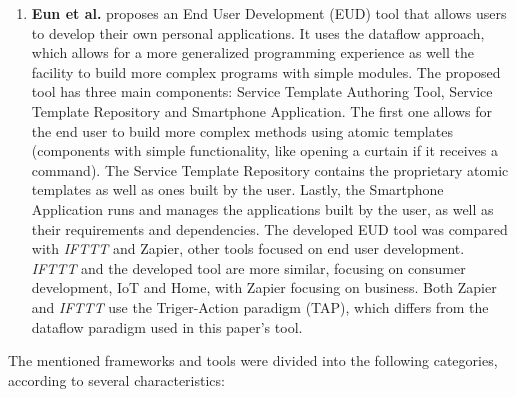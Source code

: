 \begin{enumerate}
    \item \textbf{Eun et al.} \cite{eud_platform} proposes an End User Development (EUD) tool that allows users to develop their own personal applications. It uses the dataflow approach, which allows for a more generalized programming experience as well the facility to build more complex programs with simple modules. The proposed tool has three main components: Service Template Authoring Tool, Service Template Repository and Smartphone Application. The first one allows for the end user to build more complex methods using atomic templates (components with simple functionality, like opening a curtain if it receives a command). The Service Template Repository contains the proprietary atomic templates as well as ones built by the user. Lastly, the Smartphone Application runs and manages the applications built by the user, as well as their requirements and dependencies. The developed EUD tool was compared with \textit{IFTTT} and Zapier, other tools focused on end user development. \textit{IFTTT} and the developed tool are more similar, focusing on consumer development, IoT and Home, with Zapier focusing on business. Both Zapier and \textit{IFTTT} use the Triger-Action paradigm (TAP), which differs from the dataflow paradigm used in this paper's tool.
\end{enumerate}

The mentioned frameworks and tools were divided into the following categories, according to several characteristics:

